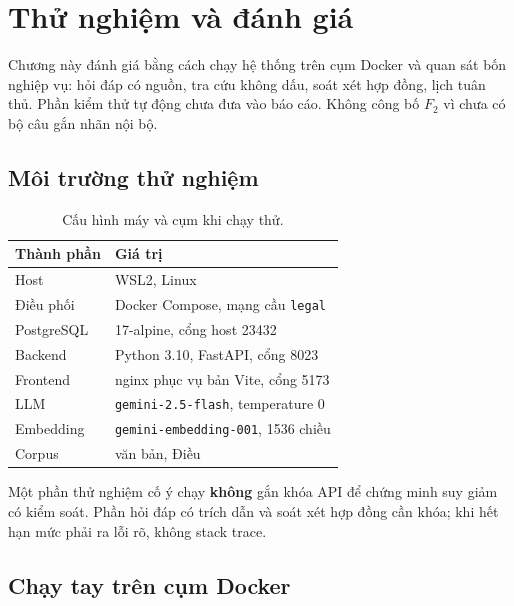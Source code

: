 \chapter{Thử nghiệm và đánh giá}

Chương này đánh giá bằng cách chạy hệ thống trên cụm Docker và quan sát bốn
nghiệp vụ: hỏi đáp có nguồn, tra cứu không dấu, soát xét hợp đồng, lịch tuân
thủ. Phần kiểm thử tự động chưa đưa vào báo cáo. Không công bố $F_2$ vì chưa có
bộ câu gắn nhãn nội bộ.

\section{Môi trường thử nghiệm}

\begin{table}[htp]
\centering
\caption{Cấu hình máy và cụm khi chạy thử.}
\label{tab:moi-truong}
\begin{tabular}{p{4.0cm}p{9.8cm}}
\toprule
\textbf{Thành phần} & \textbf{Giá trị} \\
\midrule
Host & WSL2, Linux \\
Điều phối & Docker Compose, mạng cầu \texttt{legal} \\
PostgreSQL & 17-alpine, cổng host 23432 \\
Backend & Python 3.10, FastAPI, cổng 8023 \\
Frontend & nginx phục vụ bản Vite, cổng 5173 \\
LLM & \texttt{gemini-2.5-flash}, temperature 0 \\
Embedding & \texttt{gemini-embedding-001}, 1536 chiều \\
Corpus & \soLuat{} văn bản, \soDieu{} Điều \\
\bottomrule
\end{tabular}
\end{table}

Một phần thử nghiệm cố ý chạy \textbf{không} gắn khóa API để chứng minh suy giảm
có kiểm soát. Phần hỏi đáp có trích dẫn và soát xét hợp đồng cần khóa; khi hết
hạn mức phải ra lỗi rõ, không stack trace.

\section{Chạy tay trên cụm Docker}

